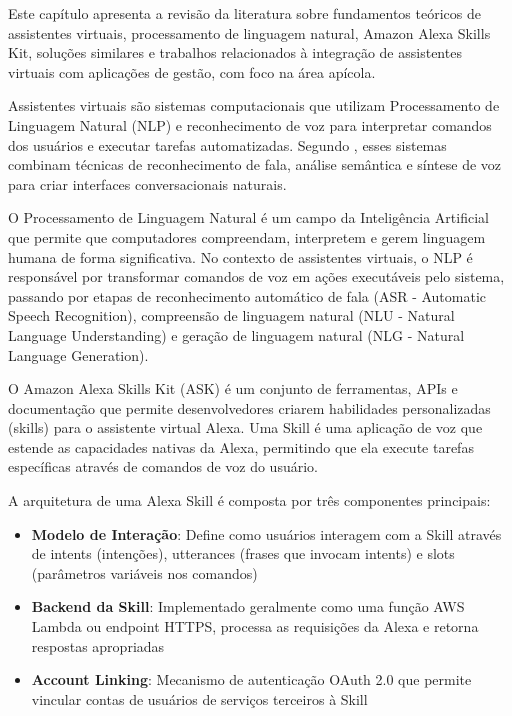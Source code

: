 \label{cap:revisao-literatura}

Este capítulo apresenta a revisão da literatura sobre fundamentos teóricos de assistentes virtuais, processamento de linguagem natural, Amazon Alexa Skills Kit, soluções similares e trabalhos relacionados à integração de assistentes virtuais com aplicações de gestão, com foco na área apícola.



Assistentes virtuais são sistemas computacionais que utilizam Processamento de Linguagem Natural (NLP) e reconhecimento de voz para interpretar comandos dos usuários e executar tarefas automatizadas. Segundo \textcite{rajanala2025}, esses sistemas combinam técnicas de reconhecimento de fala, análise semântica e síntese de voz para criar interfaces conversacionais naturais.

O Processamento de Linguagem Natural é um campo da Inteligência Artificial que permite que computadores compreendam, interpretem e gerem linguagem humana de forma significativa. No contexto de assistentes virtuais, o NLP é responsável por transformar comandos de voz em ações executáveis pelo sistema, passando por etapas de reconhecimento automático de fala (ASR - Automatic Speech Recognition), compreensão de linguagem natural (NLU - Natural Language Understanding) e geração de linguagem natural (NLG - Natural Language Generation).


O Amazon Alexa Skills Kit (ASK) é um conjunto de ferramentas, APIs e documentação que permite desenvolvedores criarem habilidades personalizadas (skills) para o assistente virtual Alexa. Uma Skill é uma aplicação de voz que estende as capacidades nativas da Alexa, permitindo que ela execute tarefas específicas através de comandos de voz do usuário.

A arquitetura de uma Alexa Skill é composta por três componentes principais:

\begin{itemize}
    \item \textbf{Modelo de Interação}: Define como usuários interagem com a Skill através de intents (intenções), utterances (frases que invocam intents) e slots (parâmetros variáveis nos comandos)
    \item \textbf{Backend da Skill}: Implementado geralmente como uma função AWS Lambda ou endpoint HTTPS, processa as requisições da Alexa e retorna respostas apropriadas
    \item \textbf{Account Linking}: Mecanismo de autenticação OAuth 2.0 que permite vincular contas de usuários de serviços terceiros à Skill
\end{itemize}

